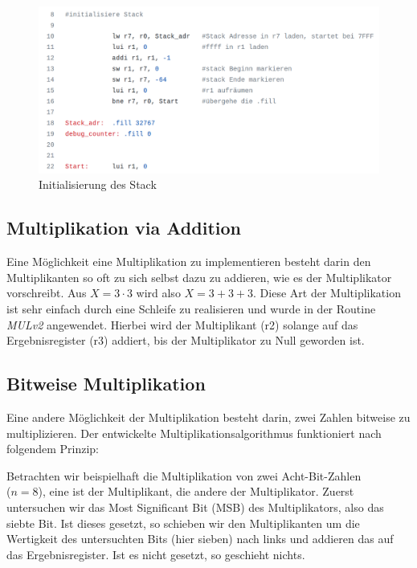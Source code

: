 \documentclass[fleqn, a4paper, 1pt]{article}       %
\begin{document}
\begin{figure}[h]
    \includegraphics[width =1\textwidth]{Stack_init.png}
\caption{Initialisierung des Stack}
\label{fig:Stack}
\end{figure}



\subsection{Multiplikation via Addition}
Eine Möglichkeit eine Multiplikation zu implementieren besteht darin den Multiplikanten so oft zu sich selbst dazu zu addieren, wie es der Multiplikator vorschreibt. Aus $X = 3 \cdot 3$ wird also $X = 3+3+3$. Diese Art der Multiplikation ist sehr einfach durch eine Schleife zu realisieren und wurde in der Routine \emph{MULv2} angewendet. Hierbei wird der Multiplikant (r2) solange auf das Ergebnisregister (r3) addiert, bis der Multiplikator zu Null geworden ist. 

\subsection{Bitweise Multiplikation}
Eine andere Möglichkeit der Multiplikation besteht darin, zwei Zahlen bitweise zu multiplizieren. Der entwickelte Multiplikationsalgorithmus funktioniert nach folgendem Prinzip: 

Betrachten wir beispielhaft die Multiplikation von zwei Acht-Bit-Zahlen \\ ($n = 8$), eine ist der Multiplikant, die andere der Multiplikator. Zuerst untersuchen wir das Most Significant Bit (MSB) des Multiplikators, also das siebte Bit. Ist dieses gesetzt, so schieben wir den Multiplikanten um die Wertigkeit des untersuchten Bits (hier sieben) nach links und addieren das auf das Ergebnisregister. Ist es nicht gesetzt, so geschieht nichts. \cite{MULv3}
\end{document}
